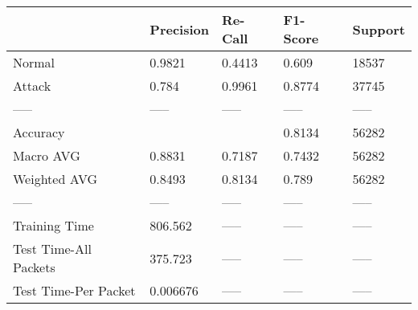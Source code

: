 \begin{tabular}{lllll}
\toprule
{} & Precision & Re-Call & F1-Score & Support \\
\midrule
Normal                &    0.9821 &  0.4413 &    0.609 &   18537 \\
Attack                &     0.784 &  0.9961 &   0.8774 &   37745 \\
-----                 &     ----- &   ----- &    ----- &   ----- \\
Accuracy              &           &         &   0.8134 &   56282 \\
Macro AVG             &    0.8831 &  0.7187 &   0.7432 &   56282 \\
Weighted AVG          &    0.8493 &  0.8134 &    0.789 &   56282 \\
-----                 &     ----- &   ----- &    ----- &   ----- \\
Training Time         &   806.562 &   ----- &    ----- &   ----- \\
Test Time-All Packets &   375.723 &   ----- &    ----- &   ----- \\
Test Time-Per Packet  &  0.006676 &   ----- &    ----- &   ----- \\
\bottomrule
\end{tabular}

